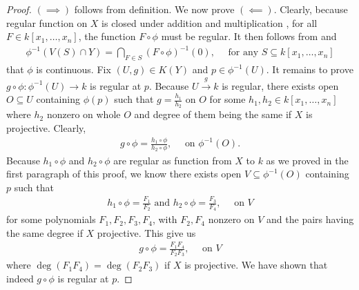 \documentclass{report}
\begin{document}
\begin{proof}
$(\implies )$ follows from definition. We now prove  $(\impliedby)$. Clearly, because regular function on $X$ is closed under addition and multiplication  , for all $F\in k[x_1,\dots ,x_n]$, the function $F\circ \phi$ must be regular. It then follows from  and 
\begin{align*}
\phi^{-1}(V(S)\cap Y)= \bigcap_{F \in S} (F\circ \phi)^{-1}(0),\quad \text{ for any }S \subseteq k[x_1,\dots ,x_n]
\end{align*}
that $\phi$ is continuous. Fix $(U,g)\in K(Y)$ and $p \in \phi^{-1}(U)$. It remains to prove $g \circ \phi:\phi^{-1}(U)\rightarrow k$ is regular at $p$. Because $U\xrightarrow{g}k$ is regular, there exists open $O\subseteq U$ containing $\phi (p)$ such that $g=\frac{h_1}{h_2}$ on $O$ for some  $h_1,h_2 \in k[x_1,\dots ,x_n]$ where $h_2$ nonzero on whole $O$ and degree of them being the same if $X$ is projective. Clearly, 
\begin{align*}
g\circ \phi = \frac{h_1 \circ \phi}{h_2 \circ \phi},\quad \text{ on }\phi^{-1}(O).
\end{align*}
Because $h_1 \circ \phi$ and $h_2 \circ \phi$ are regular as function from $X$ to $k$ as we proved in the first paragraph of this proof, we know there exists open $V \subseteq \phi^{-1}(O)$ containing $p$ such that 
\begin{align*}
h_1\circ \phi= \frac{F_1}{F_2} \text{ and }h_2 \circ \phi= \frac{F_3}{F_4},\quad \text{ on }V
\end{align*}
for some polynomials $F_1,F_2,F_3,F_4$, with $F_2,F_4$ nonzero on $V$ and the pairs having the same degree if  $X$ projective. This give us 
\begin{align*}
g\circ \phi = \frac{F_1F_4}{F_2
F_3},\quad \text{ on }V
\end{align*}
where $\operatorname{deg}(F_1F_4)=\operatorname{deg}(F_2F_3)$ if $X$ is projective. We have shown that indeed $g \circ \phi$ is regular at $p$. 
\end{proof}
\end{document}
